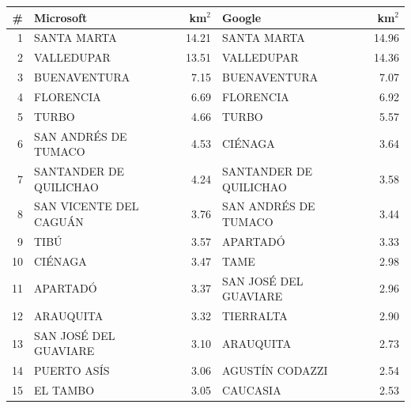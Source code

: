 \begin{tabular}{rlrlr}
\toprule
\# & Microsoft & km$^2$ & Google & km$^2$ \\
\midrule
1 & SANTA MARTA & 14.21 & SANTA MARTA & 14.96 \\
2 & VALLEDUPAR & 13.51 & VALLEDUPAR & 14.36 \\
3 & BUENAVENTURA & 7.15 & BUENAVENTURA & 7.07 \\
4 & FLORENCIA & 6.69 & FLORENCIA & 6.92 \\
5 & TURBO & 4.66 & TURBO & 5.57 \\
6 & SAN ANDRÉS DE TUMACO & 4.53 & CIÉNAGA & 3.64 \\
7 & SANTANDER DE QUILICHAO & 4.24 & SANTANDER DE QUILICHAO & 3.58 \\
8 & SAN VICENTE DEL CAGUÁN & 3.76 & SAN ANDRÉS DE TUMACO & 3.44 \\
9 & TIBÚ & 3.57 & APARTADÓ & 3.33 \\
10 & CIÉNAGA & 3.47 & TAME & 2.98 \\
11 & APARTADÓ & 3.37 & SAN JOSÉ DEL GUAVIARE & 2.96 \\
12 & ARAUQUITA & 3.32 & TIERRALTA & 2.90 \\
13 & SAN JOSÉ DEL GUAVIARE & 3.10 & ARAUQUITA & 2.73 \\
14 & PUERTO ASÍS & 3.06 & AGUSTÍN CODAZZI & 2.54 \\
15 & EL TAMBO & 3.05 & CAUCASIA & 2.53 \\
\bottomrule
\end{tabular}
